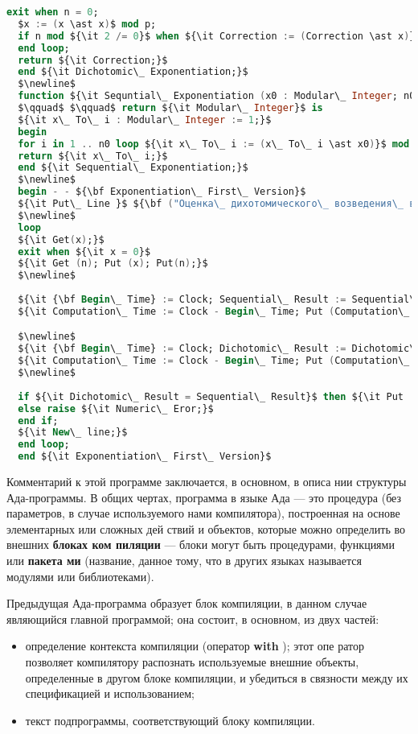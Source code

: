 \documentclass{mai_book}
\begin{document}
\newpage
\begin{lstlisting}[mathescape=true, language=Ada, basicstyle=\small]
  exit when n = 0;
  $x := (x \ast x)$ mod p;
  if n mod ${\it 2 /= 0}$ when ${\it Correction := (Correction \ast x)}$ mod p;
  end loop;
  return ${\it Correction;}$
  end ${\it Dichotomic\_ Exponentiation;}$
  $\newline$
  function ${\it Sequntial\_ Exponentiation (x0 : Modular\_ Integer; n0 : Long\_ Intege)}$
  $\qquad$ $\qquad$ return ${\it Modular\_ Integer}$ is
  ${\it x\_ To\_ i : Modular\_ Integer := 1;}$
  begin
  for i in 1 .. n0 loop ${\it x\_ To\_ i := (x\_ To\_ i \ast x0)}$ mod p; end loop;
  return ${\it x\_ To\_ i;}$
  end ${\it Sequential\_ Exponentiation;}$
  $\newline$
  begin - - ${\bf Exponentiation\_ First\_ Version}$
  ${\it Put\_ Line }$ ${\bf ("Оценка\_ дихотомического\_ возведения\_ в\_ степень.\_");}$
  $\newline$
  loop
  ${\it Get(x);}$
  exit when ${\it x = 0}$
  ${\it Get (n); Put (x); Put(n);}$
  $\newline$
  
  ${\it {\bf Begin\_ Time} := Clock; Sequential\_ Result := Sequential\_ Exponentiation (x, n);}$
  ${\it Computation\_ Time := Clock - Begin\_ Time; Put (Computation\_ Time);}$

  $\newline$
  ${\it {\bf Begin\_ Time} := Clock; Dichotomic\_ Result := Dichotomic\_ Exponentiation (x, n);}$
  ${\it Computation\_ Time := Clock - Begin\_ Time; Put (Computation\_ Time);}$
  $\newline$
  
  if ${\it Dichotomic\_ Result = Sequential\_ Result}$ then ${\it Put  (Dichotomic\_ Result);}$
  else raise ${\it Numeric\_ Eror;}$
  end if;
  ${\it New\_ line;}$
  end loop;
  end ${\it Exponentiation\_ First\_ Version}$
  \end{lstlisting} 

Комментарий к этой программе заключается, в основном, в описа­
нии структуры Ада-программы. В общих чертах, программа в языке
Ада — это процедура (без параметров, в случае используемого нами
компилятора), построенная на основе элементарных или сложных дей­
ствий и объектов, которые можно определить во внешних {\bf блоках ком­
пиляции} — блоки могут быть процедурами, функциями или {\bf пакета­
ми} (название, данное тому, что в других языках называется модулями
или библиотеками).

\newpage
Предыдущая Ада-программа образует блок компиляции, в данном
случае являющийся главной программой; она состоит, в основном, из
двух частей:
\begin{itemize}
\item определение контекста компиляции (оператор {\bf with} ); этот опе­
ратор позволяет компилятору распознать используемые внешние
объекты, определенные в другом блоке компиляции, и убедиться
в связности между их спецификацией и использованием;
\item текст подпрограммы, соответствующий блоку компиляции.
\end{itemize}
\end{document}
